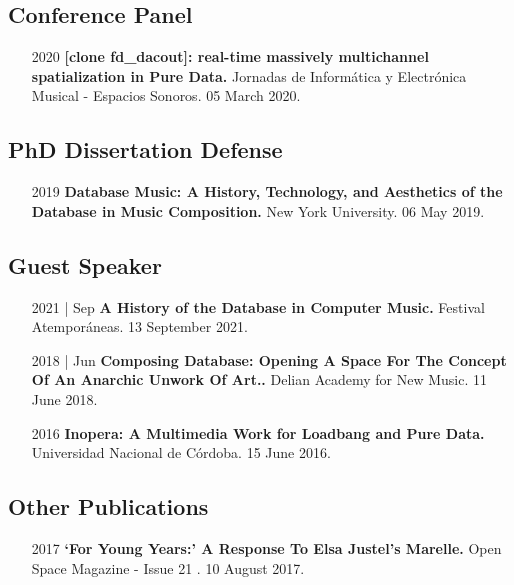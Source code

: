 \documentclass[12pt]{article}%
\begin{document}
\subsection{Conference Panel}%
\begin{itemize}[align=parleft,leftmargin=2.25cm,labelwidth=2cm]
\item[2020]
\textbf{{[}clone fd\_dacout{]}: real{-}time massively multichannel spatialization in Pure Data.}
Jornadas de Informática y Electrónica Musical {-} Espacios Sonoros. 
05 March 2020.
\end{itemize}%
\subsection{PhD Dissertation Defense}%
\begin{itemize}[align=parleft,leftmargin=2.25cm,labelwidth=2cm]
\item[2019]
\textbf{Database Music: A History, Technology, and Aesthetics of the Database in Music Composition.}
New York University. 
06 May 2019.
\end{itemize}%
\subsection{Guest Speaker}%
\begin{itemize}[align=parleft,leftmargin=2.25cm,labelwidth=2cm]
\item[2021 | Sep]
\textbf{A History of the Database in Computer Music.}
Festival Atemporáneas. 
13 September 2021.
\end{itemize}%
\begin{itemize}[align=parleft,leftmargin=2.25cm,labelwidth=2cm]
\item[2018 | Jun]
\textbf{Composing Database: Opening A Space For The Concept Of An Anarchic Unwork Of Art..}
Delian Academy for New Music. 
11 June 2018.
\end{itemize}%
\begin{itemize}[align=parleft,leftmargin=2.25cm,labelwidth=2cm]
\item[2016]
\textbf{Inopera: A Multimedia Work for Loadbang and Pure Data.}
Universidad Nacional de Córdoba. 
15 June 2016.
\end{itemize}%
\subsection{Other Publications}%
\begin{itemize}[align=parleft,leftmargin=2.25cm,labelwidth=2cm]
\item[2017]
\textbf{`For Young Years:' A Response To Elsa Justel's Marelle.}
Open Space Magazine {-} Issue 21 . 
10 August 2017.
\end{itemize}
\end{document}
